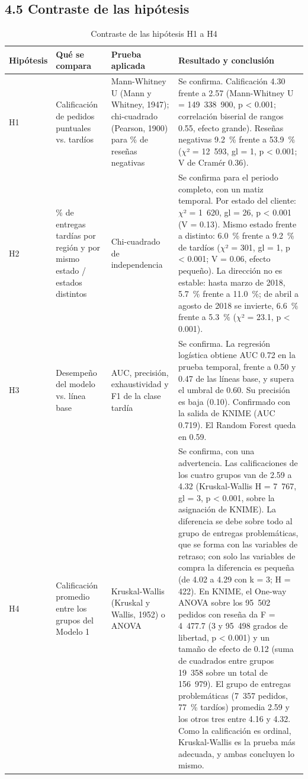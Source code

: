 \documentclass[a4paper,stu,12pt,donotrepeattitle,floatsintext]{apa7}
\begin{document}
\subsection{4.5 Contraste de las hipótesis}
{\footnotesize
\begin{longtable}{|>{\raggedright\arraybackslash}p{}|>{\raggedright\arraybackslash}p{}|>{\raggedright\arraybackslash}p{}|>{\raggedright\arraybackslash}p{}|}
\caption{Contraste de las hipótesis H1 a H4}\\
\hline
\textbf{Hipótesis} & \textbf{Qué se compara} & \textbf{Prueba aplicada} & \textbf{Resultado y conclusión} \\ \hline
\endhead
H1 & Calificación de pedidos puntuales vs. tardíos & Mann-Whitney U (Mann y Whitney, 1947); chi-cuadrado (Pearson, 1900) para \% de reseñas negativas & Se confirma. Calificación 4.30 frente a 2.57 (Mann-Whitney U = 149~338~900, p < 0.001; correlación biserial de rangos 0.55, efecto grande). Reseñas negativas 9.2~\% frente a 53.9~\% ($\chi$² = 12~593, gl = 1, p < 0.001; V de Cramér 0.36). \\ \hline
H2 & \% de entregas tardías por región y por mismo estado / estados distintos & Chi-cuadrado de independencia & Se confirma para el periodo completo, con un matiz temporal. Por estado del cliente: $\chi$² = 1~620, gl = 26, p < 0.001 (V = 0.13). Mismo estado frente a distinto: 6.0~\% frente a 9.2~\% de tardíos ($\chi$² = 301, gl = 1, p < 0.001; V = 0.06, efecto pequeño). La dirección no es estable: hasta marzo de 2018, 5.7~\% frente a 11.0~\%; de abril a agosto de 2018 se invierte, 6.6~\% frente a 5.3~\% ($\chi$² = 23.1, p < 0.001). \\ \hline
H3 & Desempeño del modelo vs. línea base & AUC, precisión, exhaustividad y F1 de la clase tardía & Se confirma. La regresión logística obtiene AUC 0.72 en la prueba temporal, frente a 0.50 y 0.47 de las líneas base, y supera el umbral de 0.60. Su precisión es baja (0.10). Confirmado con la salida de KNIME (AUC 0.719). El Random Forest queda en 0.59. \\ \hline
H4 & Calificación promedio entre los grupos del Modelo 1 & Kruskal-Wallis (Kruskal y Wallis, 1952) o ANOVA & Se confirma, con una advertencia. Las calificaciones de los cuatro grupos van de 2.59 a 4.32 (Kruskal-Wallis H = 7~767, gl = 3, p < 0.001, sobre la asignación de KNIME). La diferencia se debe sobre todo al grupo de entregas problemáticas, que se forma con las variables de retraso; con solo las variables de compra la diferencia es pequeña (de 4.02 a 4.29 con k = 3; H = 422). En KNIME, el One-way ANOVA sobre los 95~502 pedidos con reseña da F = 4~477.7 (3 y 95~498 grados de libertad, p < 0.001) y un tamaño de efecto de 0.12 (suma de cuadrados entre grupos 19~358 sobre un total de 156~979). El grupo de entregas problemáticas (7~357 pedidos, 77~\% tardíos) promedia 2.59 y los otros tres entre 4.16 y 4.32. Como la calificación es ordinal, Kruskal-Wallis es la prueba más adecuada, y ambas concluyen lo mismo. \\ \hline

\end{longtable}}
\end{document}
